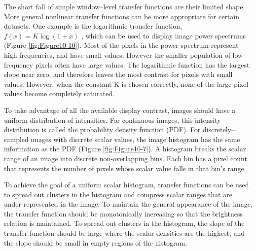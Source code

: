 The short fall of simple window--level transfer functions are their limited shape. More general nonlinear transfer functions can be more appropriate for certain datasets. One example is the logarithmic transfer function, $f(x) = K \log ( 1 + x )$ , which can be used to display image power spectrums (Figure \ref{fig:Figure10-10}). Most of the pixels in the power spectrum represent high frequencies, and have small values. However the smaller population of low-frequency pixels often have large values. The logarithmic function has the largest slope near zero, and therefore leaves the most contrast for pixels with small values. However, when the constant K is chosen correctly, none of the large pixel values become completely saturated.

To take advantage of all the available display contrast, images should have a uniform distribution of intensities. For continuous images, this intensity distribution is called the probability density function (PDF). For discretely--sampled images with discrete scalar values, the image histogram has the same information as the PDF (Figure \ref{fig:Figure10-7}). A histogram breaks the scalar range of an image into discrete non-overlapping bins. Each bin has a pixel count that represents the number of pixels whose scalar value falls in that bin's range.

To achieve the goal of a uniform scalar histogram, transfer functions can be used to spread out clusters in the histogram and compress scalar ranges that are under-represented in the image. To maintain the general appearance of the image, the transfer function should be monotonically increasing so that the brightness relation is maintained. To spread out clusters in the histogram, the slope of the transfer function should be large where the scalar densities are the highest, and the slope should be small in empty regions of the histogram.

